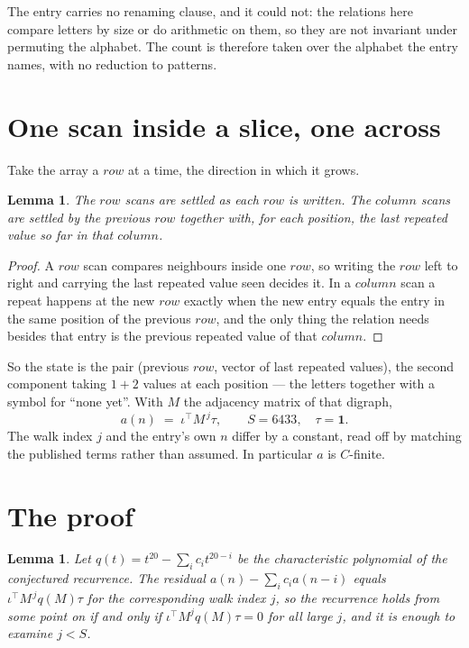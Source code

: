 \documentclass[11pt,a4paper]{article}
\theoremstyle{plain}
\newtheorem{lemma}[theorem]{Lemma}
\theoremstyle{definition}
\begin{document}
The entry carries no renaming clause, and it could not: the relations here compare letters by
size or do arithmetic on them, so they are not invariant under permuting the alphabet. The
count is therefore taken over the alphabet the entry names, with no reduction to patterns.

\section{One scan inside a slice, one across}

Take the array a $row$ at a time, the direction in which it grows.

\begin{lemma}\label{lem:state}
The $row$ scans are settled as each $row$ is written. The $column$ scans are
settled by the previous $row$ together with, for each position, the last repeated value
so far in that $column$.
\end{lemma}

\begin{proof}
A $row$ scan compares neighbours inside one $row$, so writing the
$row$ left to right and carrying the last repeated value seen decides it. In a
$column$ scan a repeat happens at the new $row$ exactly when the new entry equals the
entry in the same position of the previous $row$, and the only thing the relation needs
besides that entry is the previous repeated value of that $column$.
\end{proof}

So the state is the pair (previous $row$, vector of last repeated values), the second
component taking $1+2$ values at each position --- the letters together with a symbol for
``none yet''. With $M$ the adjacency matrix of that digraph,
\[
a(n)\;=\;\iota^{\!\top}M^{\,j}\tau ,\qquad S=6433,\quad\tau=\mathbf{1} .
\]
The walk index $j$ and the entry's own $n$ differ by a constant, read off by matching the
published terms rather than assumed. In particular $a$ is $C$-finite.

\section{The proof}

\begin{lemma}\label{lem:crit}
Let $q(t)=t^{20}-\sum_i c_it^{20-i}$ be the characteristic polynomial of the
conjectured recurrence. The residual $a(n)-\sum_ic_ia(n-i)$ equals
$\iota^{\!\top}M^{\,j}q(M)\tau$ for the corresponding walk index $j$, so the recurrence
holds from some point on if and only if $\iota^{\!\top}M^{j}q(M)\tau=0$ for all large $j$,
and it is enough to examine $j<S$.
\end{lemma}
\end{document}
